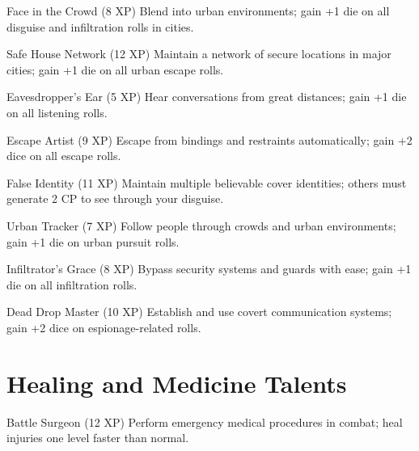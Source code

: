 \documentclass[11pt]{article}
\begin{document}
\begin{talentbox}{Face in the Crowd (8 XP)}
Blend into urban environments; gain +1 die on all disguise and infiltration rolls in cities.
\end{talentbox}

\begin{talentbox}{Safe House Network (12 XP)}
Maintain a network of secure locations in major cities; gain +1 die on all urban escape rolls.
\end{talentbox}

\begin{talentbox}{Eavesdropper's Ear (5 XP)}
Hear conversations from great distances; gain +1 die on all listening rolls.
\end{talentbox}

\begin{talentbox}{Escape Artist (9 XP)}
Escape from bindings and restraints automatically; gain +2 dice on all escape rolls.
\end{talentbox}

\begin{talentbox}{False Identity (11 XP)}
Maintain multiple believable cover identities; others must generate 2 CP to see through your disguise.
\end{talentbox}

\begin{talentbox}{Urban Tracker (7 XP)}
Follow people through crowds and urban environments; gain +1 die on urban pursuit rolls.
\end{talentbox}

\begin{talentbox}{Infiltrator's Grace (8 XP)}
Bypass security systems and guards with ease; gain +1 die on all infiltration rolls.
\end{talentbox}

\begin{talentbox}{Dead Drop Master (10 XP)}
Establish and use covert communication systems; gain +2 dice on espionage-related rolls.
\end{talentbox}

\section*{Healing and Medicine Talents}

\begin{talentbox}{Battle Surgeon (12 XP)}
Perform emergency medical procedures in combat; heal injuries one level faster than normal.
\end{talentbox}
\end{document}
